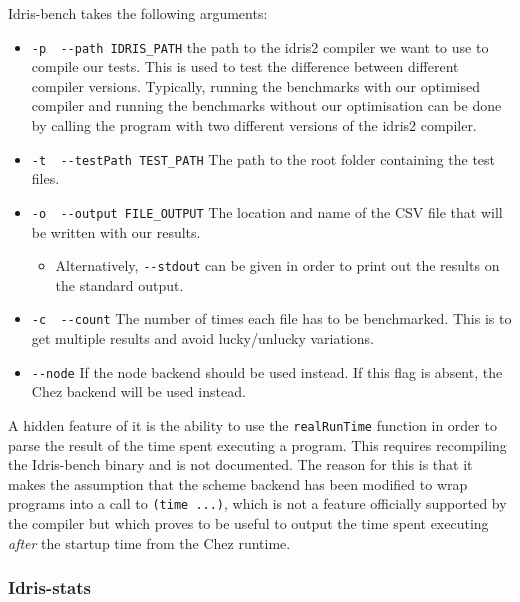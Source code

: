 \documentclass[
]{article}
\providecommand{\tightlist}{%
  \setlength{\itemsep}{0pt}\setlength{\parskip}{0pt}}
\begin{document}
Idris-bench takes the following arguments:

\begin{itemize}
\tightlist
\item
  \texttt{-p\ \textbar{}\ -\/-path\ IDRIS\_PATH} the path to the idris2
  compiler we want to use to compile our tests. This is used to test the
  difference between different compiler versions. Typically, running the
  benchmarks with our optimised compiler and running the benchmarks
  without our optimisation can be done by calling the program with two
  different versions of the idris2 compiler.
\item
  \texttt{-t\ \textbar{}\ -\/-testPath\ TEST\_PATH} The path to the root
  folder containing the test files.
\item
  \texttt{-o\ \textbar{}\ -\/-output\ FILE\_OUTPUT} The location and
  name of the CSV file that will be written with our results.

  \begin{itemize}
  \tightlist
  \item
    Alternatively, \texttt{-\/-stdout} can be given in order to print
    out the results on the standard output.
  \end{itemize}
\item
  \texttt{-c\ \textbar{}\ -\/-count} The number of times each file has
  to be benchmarked. This is to get multiple results and avoid
  lucky/unlucky variations.
\item
  \texttt{-\/-node} If the node backend should be used instead. If this
  flag is absent, the Chez backend will be used instead.
\end{itemize}

A hidden feature of it is the ability to use the \texttt{realRunTime}
function in order to parse the result of the time spent executing a
program. This requires recompiling the Idris-bench binary and is not
documented. The reason for this is that it makes the assumption that the
scheme backend has been modified to wrap programs into a call to
\texttt{(time\ ...)}, which is not a feature officially supported by the
compiler but which proves to be useful to output the time spent
executing \emph{after} the startup time from the Chez runtime.

\hypertarget{idris-stats}{%
\subsubsection{Idris-stats}\label{idris-stats}}
\end{document}
